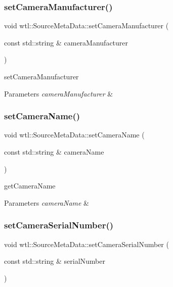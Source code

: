 \subsubsection{\texorpdfstring{set\+Camera\+Manufacturer()}{setCameraManufacturer()}}
{\footnotesize\ttfamily void wtl\+::\+Source\+Meta\+Data\+::set\+Camera\+Manufacturer (\begin{DoxyParamCaption}\item[{const std\+::string \&}]{camera\+Manufacturer }\end{DoxyParamCaption})}



set\+Camera\+Manufacturer 


\begin{DoxyParams}{Parameters}
{\em camera\+Manufacturer} & \\
\hline
\end{DoxyParams}
\mbox{\label{classwtl_1_1_source_meta_data_a065ad8b3e7cd473f95d7891d28afcb62}} 
\subsubsection{\texorpdfstring{set\+Camera\+Name()}{setCameraName()}}
{\footnotesize\ttfamily void wtl\+::\+Source\+Meta\+Data\+::set\+Camera\+Name (\begin{DoxyParamCaption}\item[{const std\+::string \&}]{camera\+Name }\end{DoxyParamCaption})}



get\+Camera\+Name 


\begin{DoxyParams}{Parameters}
{\em camera\+Name} & \\
\hline
\end{DoxyParams}
\mbox{\label{classwtl_1_1_source_meta_data_a53490561664545c7d1b7223a2c6fc9c1}} 
\subsubsection{\texorpdfstring{set\+Camera\+Serial\+Number()}{setCameraSerialNumber()}}
{\footnotesize\ttfamily void wtl\+::\+Source\+Meta\+Data\+::set\+Camera\+Serial\+Number (\begin{DoxyParamCaption}\item[{const std\+::string \&}]{serial\+Number }\end{DoxyParamCaption})}



